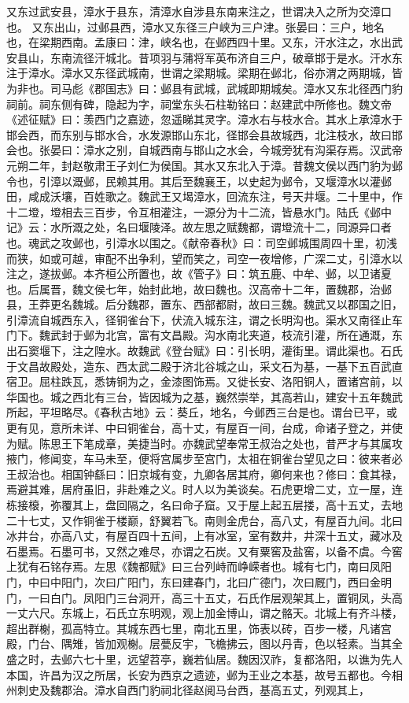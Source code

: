 \documentclass[12pt,UTF8]{ctexbook}
\begin{document}
又东过武安县，漳水于县东，清漳水自涉县东南来注之，世谓决入之所为交漳口也。
又东出山，过邺县西，漳水又东径三户峡为三户津。张晏曰：三户，地名也，在梁期西南。孟康曰：津，峡名也，在邺西四十里。又东，汗水注之，水出武安县山，东南流径汗城北。昔项羽与蒲将军英布济自三户，破章邯于是水。汗水东注于漳水。漳水又东径武城南，世谓之梁期城。梁期在邺北，俗亦渭之两期城，皆为非也。司马彪《郡国志》曰：邺县有武城，武城即期城矣。漳水又东北径西门豹祠前。祠东侧有碑，隐起为字，祠堂东头石柱勒铭曰：赵建武中所修也。魏文帝《述征赋》曰：羡西门之嘉迹，忽遥睇其灵字。漳水右与枝水合。其水上承漳水于邯会西，而东别与邯水合，水发源邯山东北，径邯会县故城西，北注枝水，故曰邯会也。张晏曰：漳水之别，自城西南与邯山之水会，今城旁犹有沟渠存焉。汉武帝元朔二年，封赵敬肃王子刘仁为侯国。其水又东北入于漳。昔魏文侯以西门豹为邺令也，引漳以溉邺，民赖其用。其后至魏襄王，以史起为邺令，又堰漳水以灌邺田，咸成沃壤，百姓歌之。魏武王又堨漳水，回流东注，号天井堰。二十里中，作十二墱，墱相去三百步，令互相灌注，一源分为十二流，皆悬水门。陆氏《邺中记》云：水所溉之处，名曰堰陵泽。故左思之赋魏都，谓墱流十二，同源异口者也。魂武之攻邺也，引漳水以围之。《献帝春秋》曰：司空邺城围周四十里，初浅而狭，如或可越，审配不出争利，望而笑之，司空一夜增修，广深二丈，引漳水以注之，遂拔邺。本齐桓公所置也，故《管子》曰：筑五鹿、中牟、邺，以卫诸夏也。后属晋，魏文侯七年，始封此地，故曰魏也。汉高帝十二年，置魏郡，治邺县，王莽更名魏城。后分魏郡，置东、西部都尉，故曰三魏。魏武又以郡国之旧，引漳流自城西东入，径铜雀台下，伏流入城东注，谓之长明沟也。渠水又南径止车门下。魏武封于邺为北宫，富有文昌殿。沟水南北夹道，枝流引灌，所在通溉，东出石窦堰下，注之隍水。故魏武《登台赋》曰：引长明，灌街里。谓此渠也。石氏于文昌故殿处，造东、西太武二殿于济北谷城之山，采文石为基，一基下五百武直宿卫。屈柱跌瓦，悉铸铜为之，金漆图饰焉。又徙长安、洛阳铜人，置诸宫前，以华国也。城之西北有三台，皆因城为之基，巍然崇举，其高若山，建安十五年魏武所起，平坦略尽。《春秋古地》云：葵丘，地名，今邺西三台是也。谓台已平，或更有见，意所未详、中曰铜雀台，高十丈，有屋百一间，台成，命诸子登之，并使为赋。陈思王下笔成章，美捷当时。亦魏武望奉常王叔治之处也，昔严才与其属攻掖门，修闻变，车马未至，便将宫属步至宫门，太祖在铜雀台望见之曰：彼来者必王叔治也。相国钟繇曰：旧京城有变，九卿各居其府，卿何来也？修曰：食其禄，焉避其难，居府虽旧，非赴难之义。时人以为美谈矣。石虎更增二丈，立一屋，连栋接榱，弥覆其上，盘回隔之，名曰命子窟。又于屋上起五层搂，高十五丈，去地二十七丈，又作铜雀于楼巅，舒翼若飞。南则金虎台，高八丈，有屋百九间。北曰冰井台，亦高八丈，有屋百四十五间，上有冰室，室有数井，井深十五丈，藏冰及石墨焉。石墨可书，又然之难尽，亦谓之石炭。又有粟窖及盐窖，以备不虞。今窖上犹有石铭存焉。左思《魏都赋》曰三台列峙而峥嵘者也。城有七门，南曰凤阳门，中曰中阳门，次曰广阳门，东曰建春门，北曰广德门，次曰厩门，西曰金明门，一曰白门。凤阳门三台洞开，高三十五丈，石氏作层观架其上，置铜凤，头高一丈六尺。东城上，石氏立东明观，观上加金博山，谓之骼天。北城上有齐斗楼，超出群榭，孤高特立。其城东西七里，南北五里，饰表以砖，百步一楼，凡诸宫殿，门台、隅雉，皆加观榭。层甍反宇，飞檐拂云，图以丹青，色以轻素。当其全盛之时，去邺六七十里，远望苕亭，巍若仙居。魏因汉祚，复都洛阳，以谯为先人本国，许昌为汉之所居，长安为西京之遗迹，邺为王业之本基，故号五都也。今相州刺史及魏郡治。漳水自西门豹祠北径赵阅马台西，基高五丈，列观其上，
\end{document}
